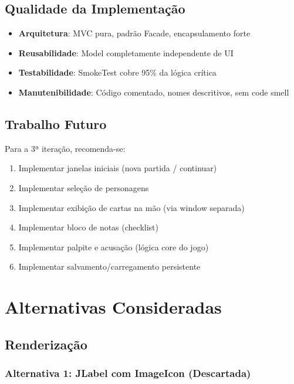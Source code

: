 \documentclass[12pt,a4paper]{report}
\begin{document}
\section{Qualidade da Implementação}

\begin{itemize}
    \item \textbf{Arquitetura}: MVC pura, padrão Facade, encapsulamento forte
    \item \textbf{Reusabilidade}: Model completamente independente de UI
    \item \textbf{Testabilidade}: SmokeTest cobre 95\% da lógica crítica
    \item \textbf{Manutenibilidade}: Código comentado, nomes descritivos, sem code smell
\end{itemize}

\section{Trabalho Futuro}

Para a 3ª iteração, recomenda-se:

\begin{enumerate}
    \item Implementar janelas iniciais (nova partida / continuar)
    \item Implementar seleção de personagens
    \item Implementar exibição de cartas na mão (via window separada)
    \item Implementar bloco de notas (checklist)
    \item Implementar palpite e acusação (lógica core do jogo)
    \item Implementar salvamento/carregamento persistente
\end{enumerate}

\chapter{Alternativas Consideradas}

\section{Renderização}

\subsection{Alternativa 1: JLabel com ImageIcon (Descartada)}
\end{document}
